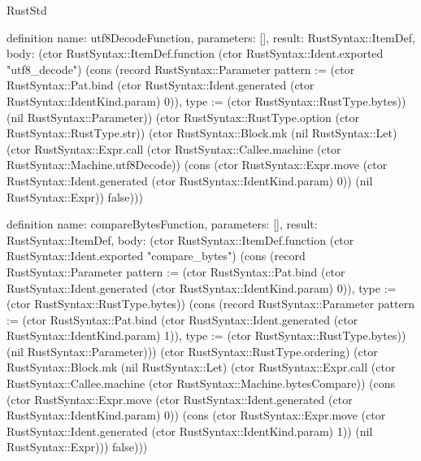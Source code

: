 \begin{lexlean}{RustStd}
\begin{semanticmodule}
definition{
  name: utf8DecodeFunction,
  parameters: [],
  result: RustSyntax::ItemDef,
  body: (ctor RustSyntax::ItemDef.function (ctor RustSyntax::Ident.exported "utf8_decode") (cons (record RustSyntax::Parameter {pattern := (ctor RustSyntax::Pat.bind (ctor RustSyntax::Ident.generated (ctor RustSyntax::IdentKind.param) 0)), type := (ctor RustSyntax::RustType.bytes)}) (nil RustSyntax::Parameter)) (ctor RustSyntax::RustType.option (ctor RustSyntax::RustType.str)) (ctor RustSyntax::Block.mk (nil RustSyntax::Let) (ctor RustSyntax::Expr.call (ctor RustSyntax::Callee.machine (ctor RustSyntax::Machine.utf8Decode)) (cons (ctor RustSyntax::Expr.move (ctor RustSyntax::Ident.generated (ctor RustSyntax::IdentKind.param) 0)) (nil RustSyntax::Expr)) false)))
}

definition{
  name: compareBytesFunction,
  parameters: [],
  result: RustSyntax::ItemDef,
  body: (ctor RustSyntax::ItemDef.function (ctor RustSyntax::Ident.exported "compare_bytes") (cons (record RustSyntax::Parameter {pattern := (ctor RustSyntax::Pat.bind (ctor RustSyntax::Ident.generated (ctor RustSyntax::IdentKind.param) 0)), type := (ctor RustSyntax::RustType.bytes)}) (cons (record RustSyntax::Parameter {pattern := (ctor RustSyntax::Pat.bind (ctor RustSyntax::Ident.generated (ctor RustSyntax::IdentKind.param) 1)), type := (ctor RustSyntax::RustType.bytes)}) (nil RustSyntax::Parameter))) (ctor RustSyntax::RustType.ordering) (ctor RustSyntax::Block.mk (nil RustSyntax::Let) (ctor RustSyntax::Expr.call (ctor RustSyntax::Callee.machine (ctor RustSyntax::Machine.bytesCompare)) (cons (ctor RustSyntax::Expr.move (ctor RustSyntax::Ident.generated (ctor RustSyntax::IdentKind.param) 0)) (cons (ctor RustSyntax::Expr.move (ctor RustSyntax::Ident.generated (ctor RustSyntax::IdentKind.param) 1)) (nil RustSyntax::Expr))) false)))
}


\end{semanticmodule}
\end{lexlean}
